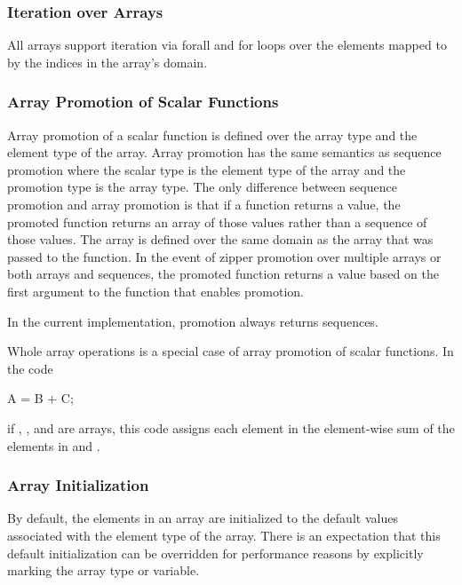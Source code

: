 \subsubsection{Iteration over Arrays}
\label{Iteration_over_Arrays}

All arrays support iteration via forall and for loops over the
elements mapped to by the indices in the array's domain.

\subsubsection{Array Promotion of Scalar Functions}
\label{Array_Promotion_of_Scalar_Functions}

Array promotion of a scalar function is defined over the array type
and the element type of the array.  Array promotion has the same
semantics as sequence promotion where the scalar type is the element
type of the array and the promotion type is the array type.  The only
difference between sequence promotion and array promotion is that if a
function returns a value, the promoted function returns an array of
those values rather than a sequence of those values.  The array is
defined over the same domain as the array that was passed to the
function.  In the event of zipper promotion over multiple arrays or
both arrays and sequences, the promoted function returns a value based
on the first argument to the function that enables promotion.

\begin{status}
In the current implementation, promotion always returns sequences.
\end{status}

\begin{example}
Whole array operations is a special case of array promotion of scalar
functions.  In the code
\begin{chapel}
A = B + C;
\end{chapel}
if , , and  are arrays, this code assigns each
element in  the element-wise sum of the elements in 
and .
\end{example}

\subsubsection{Array Initialization}
\label{Array_Initialization}

By default, the elements in an array are initialized to the default
values associated with the element type of the array.  There is an
expectation that this default initialization can be overridden for
performance reasons by explicitly marking the array type or variable.

